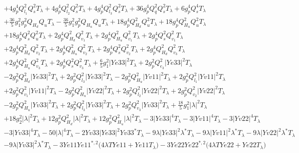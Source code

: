 \begin{align}
 &+4 g_{p}^{4} Q_{l_1}^{2} Q_{s}^{2} T_{\lambda} +4 g_{p}^{4} Q_{l_2}^{2} Q_{s}^{2} T_{\lambda} +4 g_{p}^{4} Q_{l_3}^{2} Q_{s}^{2} T_{\lambda} +36 g_{p}^{4} Q_{q}^{2} Q_{s}^{2} T_{\lambda} +6 g_{p}^{4} Q_{s}^{4} T_{\lambda} \nonumber \\ 
 &+\frac{36}{5} g_{1}^{2} g_{p}^{2} Q_{H_d} Q_{u} T_{\lambda} -\frac{36}{5} g_{1}^{2} g_{p}^{2} Q_{H_u} Q_{u} T_{\lambda} +18 g_{p}^{4} Q_{H_d}^{2} Q_{u}^{2} T_{\lambda} +18 g_{p}^{4} Q_{H_u}^{2} Q_{u}^{2} T_{\lambda} \nonumber \\ 
 &+18 g_{p}^{4} Q_{s}^{2} Q_{u}^{2} T_{\lambda} +2 g_{p}^{4} Q_{H_d}^{2} Q_{v_1}^{2} T_{\lambda} +2 g_{p}^{4} Q_{H_u}^{2} Q_{v_1}^{2} T_{\lambda} +2 g_{p}^{4} Q_{s}^{2} Q_{v_1}^{2} T_{\lambda} \nonumber \\ 
 &+2 g_{p}^{4} Q_{H_d}^{2} Q_{v_2}^{2} T_{\lambda} +2 g_{p}^{4} Q_{H_u}^{2} Q_{v_2}^{2} T_{\lambda} +2 g_{p}^{4} Q_{s}^{2} Q_{v_2}^{2} T_{\lambda} +2 g_{p}^{4} Q_{H_d}^{2} Q_{v_3}^{2} T_{\lambda} \nonumber \\ 
 &+2 g_{p}^{4} Q_{H_u}^{2} Q_{v_3}^{2} T_{\lambda} +2 g_{p}^{4} Q_{s}^{2} Q_{v_3}^{2} T_{\lambda} +\frac{6}{5} g_{1}^{2} |Ye33|^2 T_{\lambda} +2 g_{p}^{2} Q_{e_3}^{2} |Ye33|^2 T_{\lambda} \nonumber \\ 
 &-2 g_{p}^{2} Q_{H_d}^{2} |Ye33|^2 T_{\lambda} +2 g_{p}^{2} Q_{l_3}^{2} |Ye33|^2 T_{\lambda} -2 g_{p}^{2} Q_{H_u}^{2} |Yv11|^2 T_{\lambda} +2 g_{p}^{2} Q_{l_1}^{2} |Yv11|^2 T_{\lambda} \nonumber \\ 
 &+2 g_{p}^{2} Q_{v_1}^{2} |Yv11|^2 T_{\lambda} -2 g_{p}^{2} Q_{H_u}^{2} |Yv22|^2 T_{\lambda} +2 g_{p}^{2} Q_{l_2}^{2} |Yv22|^2 T_{\lambda} +2 g_{p}^{2} Q_{v_2}^{2} |Yv22|^2 T_{\lambda} \nonumber \\ 
 &-2 g_{p}^{2} Q_{H_u}^{2} |Yv33|^2 T_{\lambda} +2 g_{p}^{2} Q_{l_3}^{2} |Yv33|^2 T_{\lambda} +2 g_{p}^{2} Q_{v_3}^{2} |Yv33|^2 T_{\lambda} +\frac{18}{5} g_{1}^{2} |\lambda|^2 T_{\lambda} \nonumber \\ 
 &+18 g_{2}^{2} |\lambda|^2 T_{\lambda} +12 g_{p}^{2} Q_{H_d}^{2} |\lambda|^2 T_{\lambda} +12 g_{p}^{2} Q_{H_u}^{2} |\lambda|^2 T_{\lambda} -3 |Ye33|^4 T_{\lambda} -3 |Yv11|^4 T_{\lambda} -3 |Yv22|^4 T_{\lambda} \nonumber \\ 
 &-3 |Yv33|^4 T_{\lambda} -50 |\lambda|^4 T_{\lambda} -2 Yv33 |Ye33|^2 Yv33^* T_{\lambda} -9 \lambda |Ye33|^2 \lambda^* T_{\lambda} -9 \lambda |Yv11|^2 \lambda^* T_{\lambda} -9 \lambda |Yv22|^2 \lambda^* T_{\lambda} \nonumber \\ 
 &-9 \lambda |Yv33|^2 \lambda^* T_{\lambda} -3 Ye11 Ye11^{*,2} \Big(4 \lambda TYe11  + Ye11 T_{\lambda} \Big)-3 Ye22 Ye22^{*,2} \Big(4 \lambda TYe22  + Ye22 T_{\lambda} \Big)\nonumber \\ 

\end{align}
